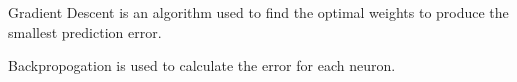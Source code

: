 Gradient Descent is an algorithm used to find the optimal weights to produce the
smallest prediction error.

Backpropogation is used to calculate the error for each neuron.
